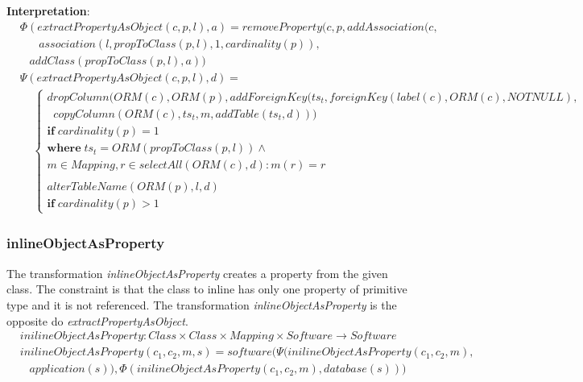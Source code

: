 \documentclass[10pt]{article}
\begin{document}
\noindent \textbf{Interpretation}:
\begin{align}
& \Phi(extractPropertyAsObject(c, p, l), a) =  removeProperty(c, p, addAssociation(c,  \nonumber \\
& \;\;\;\;\;\; association(l, propToClass(p, l), 1,cardinality(p)), \nonumber \\
 & \;\;\;  addClass(propToClass(p, l), a))
\end{align}
\begin{align}
& \Psi(extractPropertyAsObject(c, p, l), d) = \\
& \;\;\;\; \begin{cases}
dropColumn(ORM(c), ORM(p), addForeignKey(ts_t, foreignKey(label(c), ORM(c), NOTNULL), \\
 \;\; copyColumn(ORM(c), ts_t, m, addTable(ts_t, d))) \\
 \mathbf{if}\; cardinality(p) = 1 \\
 \mathbf{where} \; ts_t = ORM(propToClass(p, l)) \land \\
 m \in Mapping, r \in selectAll(ORM(c),d) : m(r) = r 
 \\\\
 alterTableName(ORM(p), l, d) \\
 \mathbf{if}\; cardinality(p) > 1
 \end{cases}
\end{align}


\subsubsection{inlineObjectAsProperty}
The transformation \emph{inlineObjectAsProperty} creates a property from the given class. The constraint is that the class to inline has only one property of primitive type and it is not referenced. The transformation \emph{inlineObjectAsProperty} is the opposite do \emph{extractPropertyAsObject}.
\begin{align}
& inilineObjectAsProperty: Class \times Class \times Mapping \times Software \rightarrow Software \nonumber \\
& inilineObjectAsProperty(c_1, c_2, m, s) = software(\Psi(inilineObjectAsProperty(c_1, c_2, m), \nonumber \\  
& \;\;\; application(s)), \Phi(inilineObjectAsProperty(c_1, c_2, m), database(s)))
\end{align}
\end{document}
